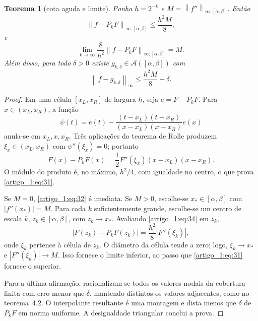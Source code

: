 \documentclass[12pt,a4paper]{article}
\theoremstyle{preciso}
\newtheorem{teorema}{Teorema}[section]
\theoremstyle{definition}
\newcommand{\Asm}{\mathcal A}
\newcommand{\norm}[1]{\left\|#1\right\|_{\infty}}
\newcommand{\normK}[2]{\left\|#1\right\|_{\infty,#2}}
\newcommand{\eqn}[2]{\begin{equation}\label{eq:#1}#2\end{equation}}
\theoremstyle{preciso}
\theoremstyle{preciso}
\theoremstyle{preciso}
\theoremstyle{preciso}
\theoremstyle{definition}
\theoremstyle{preciso}
\theoremstyle{definition}
\theoremstyle{preciso}
\theoremstyle{preciso}
\theoremstyle{definition}
\begin{document}
\begin{teorema}[cota aguda e limite]\label{map:artigo_1:5.1}
Ponha $h=2^{-k}$ e $M=\normK{f''}{[\alpha,\beta]}$. Então
\eqn{31}{\normK{f-P_kF}{[\alpha,\beta]}\le\frac{h^2M}8,}
e
\eqn{32}{\lim_{k\to\infty}\frac8{h^2}\normK{f-P_kF}{[\alpha,\beta]}=M.}
Além disso, para todo $\delta>0$ existe $g_{k,\delta}\in\Asm([\alpha,\beta])$ com
\eqn{33}{\norm{f-g_{k,\delta}}\le\frac{h^2M}8+\delta.}
\end{teorema}
\begin{proof}
Em uma célula $[x_L,x_R]$ de largura $h$, seja $e=F-P_kF$. Para $x\in(x_L,x_R)$, a função
\[
\psi(t)=e(t)-\frac{(t-x_L)(t-x_R)}{(x-x_L)(x-x_R)}e(x)
\]
anula-se em $x_L,x,x_R$. Três aplicações do teorema de Rolle produzem $\xi_x\in(x_L,x_R)$ com $\psi''(\xi_x)=0$; portanto
\eqn{34}{F(x)-P_kF(x)=\frac12F''(\xi_x)(x-x_L)(x-x_R).}
O módulo do produto é, no máximo, $h^2/4$, com igualdade no centro, o que prova \eqref{artigo_1:eq:31}.

Se $M=0$, \eqref{artigo_1:eq:32} é imediata. Se $M>0$, escolhe-se $x_*\in[\alpha,\beta]$ com $|f''(x_*)|=M$. Para cada $k$ suficientemente grande, escolhe-se um centro de escala $k$, $z_k\in[\alpha,\beta]$, com $z_k\to x_*$. Avaliando \eqref{artigo_1:eq:34} em $z_k$,
\[
|F(z_k)-P_kF(z_k)|=\frac{h^2}8|F''(\xi_k)|,
\]
onde $\xi_k$ pertence à célula de $z_k$. O diâmetro da célula tende a zero; logo, $\xi_k\to x_*$ e $|F''(\xi_k)|\to M$. Isso fornece o limite inferior, ao passo que \eqref{artigo_1:eq:31} fornece o superior.

Para a última afirmação, racionalizam-se todos os valores nodais da cobertura finita com erro menor que $\delta$, mantendo distintos os valores adjacentes, como no teorema~4.2. O interpolante resultante é uma montagem e dista menos que $\delta$ de $P_kF$ em norma uniforme. A desigualdade triangular conclui a prova.
\end{proof}
\end{document}
